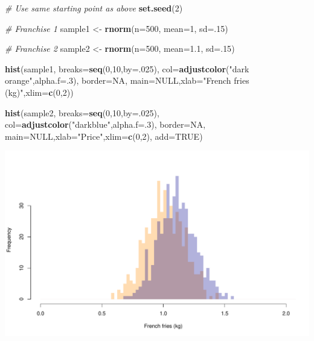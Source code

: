 \documentclass[
]{book}
\newenvironment{Shaded}{\begin{snugshade}}{\end{snugshade}}
\newcommand{\CommentTok}[1]{\textcolor[rgb]{0.56,0.35,0.01}{\textit{#1}}}
\newcommand{\DataTypeTok}[1]{\textcolor[rgb]{0.13,0.29,0.53}{#1}}
\newcommand{\DecValTok}[1]{\textcolor[rgb]{0.00,0.00,0.81}{#1}}
\newcommand{\FloatTok}[1]{\textcolor[rgb]{0.00,0.00,0.81}{#1}}
\newcommand{\KeywordTok}[1]{\textcolor[rgb]{0.13,0.29,0.53}{\textbf{#1}}}
\newcommand{\NormalTok}[1]{#1}
\newcommand{\OtherTok}[1]{\textcolor[rgb]{0.56,0.35,0.01}{#1}}
\newcommand{\StringTok}[1]{\textcolor[rgb]{0.31,0.60,0.02}{#1}}
\begin{document}
\begin{Shaded}
\begin{Highlighting}[]
\CommentTok{# Use same starting point as above}
\KeywordTok{set.seed}\NormalTok{(}\DecValTok{2}\NormalTok{)}

\CommentTok{# Franchise 1}
\NormalTok{sample1 <-}\StringTok{ }\KeywordTok{rnorm}\NormalTok{(}\DataTypeTok{n=}\DecValTok{500}\NormalTok{, }\DataTypeTok{mean=}\DecValTok{1}\NormalTok{, }\DataTypeTok{sd=}\NormalTok{.}\DecValTok{15}\NormalTok{)}

\CommentTok{# Franchise 2}
\NormalTok{sample2 <-}\StringTok{ }\KeywordTok{rnorm}\NormalTok{(}\DataTypeTok{n=}\DecValTok{500}\NormalTok{, }\DataTypeTok{mean=}\FloatTok{1.1}\NormalTok{, }\DataTypeTok{sd=}\NormalTok{.}\DecValTok{15}\NormalTok{)}

\KeywordTok{hist}\NormalTok{(sample1,}
     \DataTypeTok{breaks=}\KeywordTok{seq}\NormalTok{(}\DecValTok{0}\NormalTok{,}\DecValTok{10}\NormalTok{,}\DataTypeTok{by=}\NormalTok{.}\DecValTok{025}\NormalTok{),}
     \DataTypeTok{col=}\KeywordTok{adjustcolor}\NormalTok{(}\StringTok{"dark orange"}\NormalTok{,}\DataTypeTok{alpha.f=}\NormalTok{.}\DecValTok{3}\NormalTok{),}
     \DataTypeTok{border=}\OtherTok{NA}\NormalTok{,}
     \DataTypeTok{main=}\OtherTok{NULL}\NormalTok{,}\DataTypeTok{xlab=}\StringTok{"French fries (kg)"}\NormalTok{,}\DataTypeTok{xlim=}\KeywordTok{c}\NormalTok{(}\DecValTok{0}\NormalTok{,}\DecValTok{2}\NormalTok{))}

\KeywordTok{hist}\NormalTok{(sample2,}
     \DataTypeTok{breaks=}\KeywordTok{seq}\NormalTok{(}\DecValTok{0}\NormalTok{,}\DecValTok{10}\NormalTok{,}\DataTypeTok{by=}\NormalTok{.}\DecValTok{025}\NormalTok{),}
     \DataTypeTok{col=}\KeywordTok{adjustcolor}\NormalTok{(}\StringTok{"darkblue"}\NormalTok{,}\DataTypeTok{alpha.f=}\NormalTok{.}\DecValTok{3}\NormalTok{),}
     \DataTypeTok{border=}\OtherTok{NA}\NormalTok{,}
     \DataTypeTok{main=}\OtherTok{NULL}\NormalTok{,}\DataTypeTok{xlab=}\StringTok{"Price"}\NormalTok{,}\DataTypeTok{xlim=}\KeywordTok{c}\NormalTok{(}\DecValTok{0}\NormalTok{,}\DecValTok{2}\NormalTok{),}
     \DataTypeTok{add=}\OtherTok{TRUE}\NormalTok{)}
\end{Highlighting}
\end{Shaded}

\includegraphics{figures/unnamed-chunk-182-1.pdf}
\end{document}
